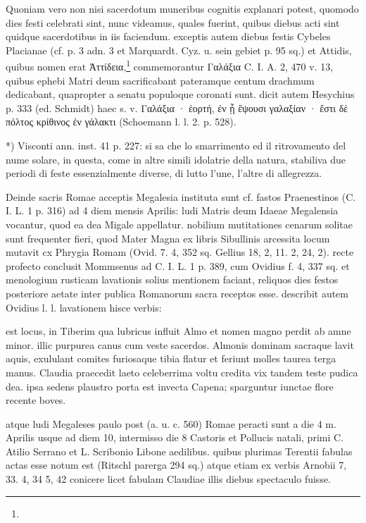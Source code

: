 \documentclass[a4paper, 11pt, oneside, polutonikogreek, german]{article}
\begin{document}
Quoniam vero non nisi sacerdotum muneribus cognitis explanari potest, quomodo dies festi celebrati sint, nunc videamus, quales fuerint, quibus diebus acti sint quidque sacerdotibus in iis faciendum. exceptis autem diebus festis Cybeles Placianae (cf. p. 3 adn. 3 et Marquardt. Cyz. u. sein gebiet p. 95 sq.) et Attidis, quibus nomen erat Ἀττίδεια,\footnote{} commemorantur Γαλάξια C. I. A. 2, 470 v. 13, quibus ephebi Matri deum sacrificabant pateramque centum drachmum dedicabant, quapropter a senatu populoque coronati sunt. dicit autem Hesychius p. 333 (ed. Schmidt) haec s. v. Γαλάξια · ἑορτή, ἐν ᾗ ἕψουσι γαλαξίαν · ἔστι δὲ πόλτος κρίθινος ἐν γάλακτι (Schoemann l. l. 2. p. 528).

*) Visconti ann. inst. 41 p. 227: si sa che lo smarrimento ed il ritrovamento del nume solare, in questa, come in altre simili idolatrie della natura, stabiliva due periodi di feste essenzialmente diverse, di lutto l'une, l'altre di allegrezza.

Deinde sacris Romae acceptis Megalesia instituta sunt cf. fastos Praenestinos (C. I. L. 1 p. 316) ad 4 diem mensis Aprilis: ludi Matris deum Idaeae Megalensia vocantur, quod ea dea Migale appellatur. nobilium mutitationes cenarum solitae sunt frequenter fieri, quod Mater Magna ex libris Sibullinis arcessita locum mutavit cx Phrygia Romam (Ovid. 7. 4, 352 sq. Gellius 18, 2, 11. 2, 24, 2). recte profecto conclusit Mommsenus ad C. I. L. 1 p. 389, cum Ovidius f. 4, 337 sq. et menologium rusticam lavationis solius mentionem faciant, reliquos dies festos posteriore aetate inter publica Romanorum sacra receptos esse. describit autem Ovidius l. l. lavationem hisce verbis:

est locus, in Tiberim qua lubricus influit Almo  et nomen magno perdit ab amne minor.  illic purpurea canus cum veste sacerdos.  Almonis dominam sacraque lavit aquis,  exululant comites furiosaque tibia flatur  et feriunt molles taurea terga manus.  Claudia praecedit laeto celeberrima voltu  credita vix tandem teste pudica dea.  ipsa sedens plaustro porta est invecta Capena;  sparguntur iunctae flore recente boves.

atque ludi Megaleses paulo post (a. u. c. 560) Romae peracti sunt a die 4 m. Aprilis usque ad diem 10, intermisso die 8 Castoris et Pollucis natali, primi C. Atilio Serrano et L. Scribonio Libone aedilibus. quibus plurimas Terentii fabulas actas esse notum est (Ritschl parerga 294 sq.) atque etiam ex verbis Arnobii 7, 33. 4, 34 5, 42 conicere licet fabulam Claudiae illis diebus spectaculo fuisse.
\end{document}
